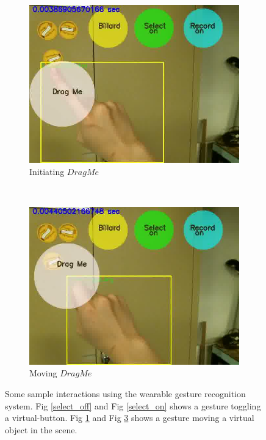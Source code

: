 \begin{figure}
\begin{subfigure}[b]{0.5\columnwidth}
        \centering
        \includegraphics[width=\columnwidth]{ch5/figs/45}
        \caption{Initiating $Drag Me$}\label{drag_init}
    \end{subfigure}~\begin{subfigure}[b]{0.5\columnwidth}
        \centering
        \includegraphics[width=\columnwidth]{ch5/figs/46}
        \caption{Moving $Drag Me$}\label{drag_me}
    \end{subfigure}
    \caption{Some sample interactions using the wearable gesture recognition system. Fig \ref{select_off} and Fig \ref{select_on} shows a gesture toggling a virtual-button. Fig \ref{drag_init} and Fig \ref{drag_me} shows a gesture moving a virtual object in the scene.}
\end{figure}

